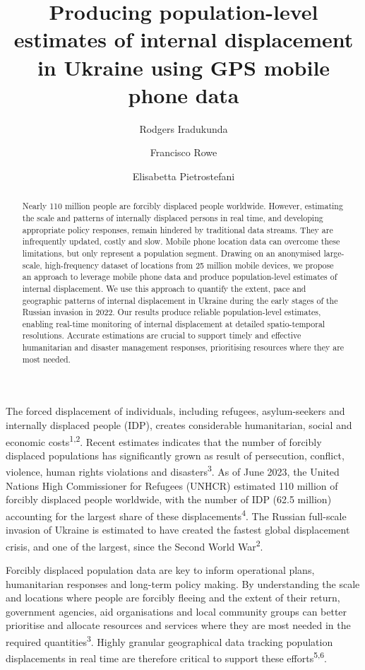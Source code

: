 \documentclass[
  11pt,
]{article}
\title{\textbf{Producing population-level estimates of internal
displacement in Ukraine using GPS mobile phone data}}
\author[1]{Rodgers Iradukunda}
\author[1]{Francisco Rowe}
\author[1]{Elisabetta Pietrostefani}
\affil[1]{Geographic Data Science Lab, Department of Geography and
Planning, University of Liverpool, Liverpool, United Kingdom}
\date{}
\begin{document}
\maketitle
\begin{abstract}
Nearly 110 million people are forcibly displaced people worldwide.
However, estimating the scale and patterns of internally displaced
persons in real time, and developing appropriate policy responses,
remain hindered by traditional data streams. They are infrequently
updated, costly and slow. Mobile phone location data can overcome these
limitations, but only represent a population segment. Drawing on an
anonymised large-scale, high-frequency dataset of locations from 25
million mobile devices, we propose an approach to leverage mobile phone
data and produce population-level estimates of internal displacement. We
use this approach to quantify the extent, pace and geographic patterns
of internal displacement in Ukraine during the early stages of the
Russian invasion in 2022. Our results produce reliable population-level
estimates, enabling real-time monitoring of internal displacement at
detailed spatio-temporal resolutions. Accurate estimations are crucial
to support timely and effective humanitarian and disaster management
responses, prioritising resources where they are most needed.
\end{abstract}


\newpage

The forced displacement of individuals, including refugees,
asylum-seekers and internally displaced people (IDP), creates
considerable humanitarian, social and economic
costs\textsuperscript{1,2}. Recent estimates indicates that the number
of forcibly displaced populations has significantly grown as result of
persecution, conflict, violence, human rights violations and
disasters\textsuperscript{3}. As of June 2023, the United Nations High
Commissioner for Refugees (UNHCR) estimated 110 million of forcibly
displaced people worldwide, with the number of IDP (62.5 million)
accounting for the largest share of these
displacements\textsuperscript{4}. The Russian full-scale invasion of
Ukraine is estimated to have created the fastest global displacement
crisis, and one of the largest, since the Second World
War\textsuperscript{2}.

Forcibly displaced population data are key to inform operational plans,
humanitarian responses and long-term policy making. By understanding the
scale and locations where people are forcibly fleeing and the extent of
their return, government agencies, aid organisations and local community
groups can better prioritise and allocate resources and services where
they are most needed in the required quantities\textsuperscript{3}.
Highly granular geographical data tracking population displacements in
real time are therefore critical to support these
efforts\textsuperscript{5,6}.
\end{document}
